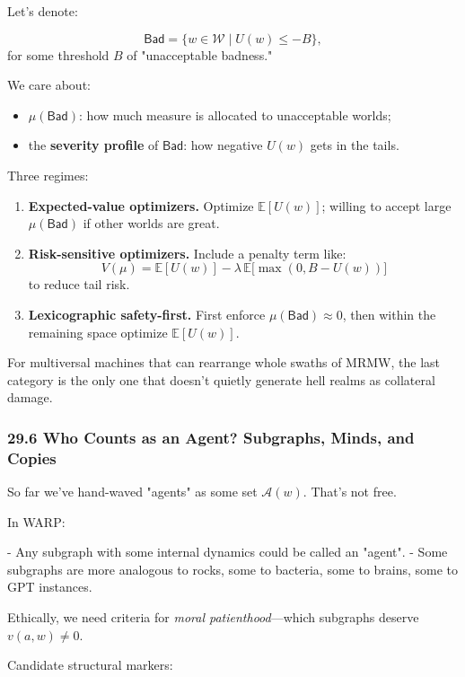 Let’s denote:

\[
  \mathsf{Bad} = \{ w \in \mathcal{W} \mid U(w) \leq -B \},
\]
for some threshold $B$ of "unacceptable badness."

We care about:

\begin{itemize}
  \item $\mu(\mathsf{Bad})$: how much measure is allocated to unacceptable worlds;
  \item the \textbf{severity profile} of $\mathsf{Bad}$: how negative $U(w)$ gets in the tails.
\end{itemize}

Three regimes:

\begin{enumerate}
  \item \textbf{Expected-value optimizers.} Optimize $\mathbb{E}[U(w)]$; willing to accept large $\mu(\mathsf{Bad})$ if other worlds are great.

  \item \textbf{Risk-sensitive optimizers.} Include a penalty term like:
    \[
      V(\mu) = \mathbb{E}[U(w)] - \lambda \, \mathbb{E}\big[ \max(0, B - U(w)) \big]
    \]
    to reduce tail risk.

  \item \textbf{Lexicographic safety-first.} First enforce $\mu(\mathsf{Bad}) \approx 0$, then within the remaining space optimize $\mathbb{E}[U(w)]$.
\end{enumerate}

For multiversal machines that can rearrange whole swaths of MRMW, the last category is the only one that doesn’t quietly generate hell realms as collateral damage.

\subsubsection*{29.6  Who Counts as an Agent? Subgraphs, Minds, and Copies}

So far we’ve hand-waved "agents" as some set $\mathcal{A}(w)$. That’s not free.

In WARP:

- Any subgraph with some internal dynamics could be called an "agent".
- Some subgraphs are more analogous to rocks, some to bacteria, some to brains, some to GPT instances.

Ethically, we need criteria for \emph{moral patienthood}—which subgraphs deserve $v(a,w) \neq 0$.

Candidate structural markers:


